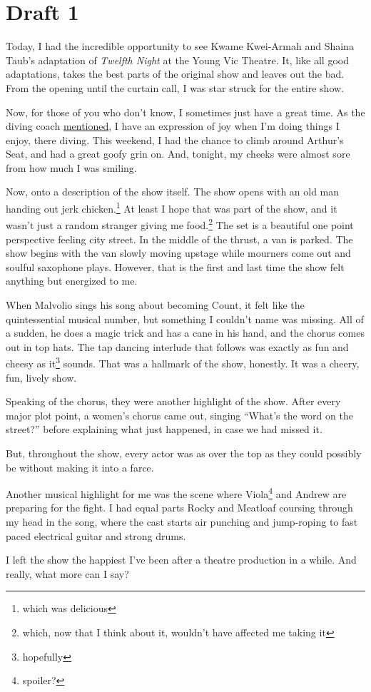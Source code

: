 \documentclass[12pt]{article}[titlepage]
\newcommand{\say}[1]{``#1''}
\newcommand{\1}{\={a}}
\newcommand{\2}{\={e}}
\newcommand{\3}{\={\i}}
\newcommand{\4}{\=o}
\newcommand{\5}{\=u}
\newcommand{\6}{\={A}}
\renewcommand{\,}{\textsuperscript{,}}
\begin{document}
\section{Draft 1}
Today, I had the incredible opportunity to see Kwame Kwei-Armah and Shaina Taub's adaptation of \textit{Twelfth Night} at the Young Vic Theatre.
It, like all good adaptations, takes the best parts of the original show and leaves out the bad.
From the opening until the curtain call, I was star struck for the entire show.

Now, for those of you who don't know, I sometimes just have a great time.
As the diving coach \href{diving.html}{mentioned}, I have an expression of joy when I'm doing things I enjoy, there diving.
This weekend, I had the chance to climb around Arthur's Seat, and had a great goofy grin on.
And, tonight, my cheeks were almost sore from how much I was smiling.

Now, onto a description of the show itself.
The show opens with an old man handing out jerk chicken.\footnote{which was delicious}
At least I hope that was part of the show, and it wasn't just a random stranger giving me food.\footnote{which, now that I think about it, wouldn't have affected me taking it}
The set is a beautiful one point perspective feeling city street.
In the middle of the thrust, a van is parked.
The show begins with the van slowly moving upstage while mourners come out and soulful saxophone plays.
However, that is the first and last time the show felt anything but energized to me.

When Malvolio sings his song about becoming Count, it felt like the quintessential musical number, but something I couldn't name was missing.
All of a sudden, he does a magic trick and has a cane in his hand, and the chorus comes out in top hats.
The tap dancing interlude that follows was exactly as fun and cheesy as it\footnote{hopefully} sounds.
That was a hallmark of the show, honestly.
It was a cheery, fun, lively show.

Speaking of the chorus, they were another highlight of the show.
After every major plot point, a women's chorus came out, singing \say{What's the word on the street?} before explaining what just happened, in case we had missed it.

But, throughout the show, every actor was as over the top as they could possibly be without making it into a farce.

Another musical highlight for me was the scene where Viola\footnote{spoiler?} and Andrew are preparing for the fight.
I had equal parts Rocky and Meatloaf coursing through my head in the song, where the cast starts air punching and jump-roping to fast paced electrical guitar and strong drums.

I left the show the happiest I've been after a theatre production in a while.
And really, what more can I say?
\end{document}
